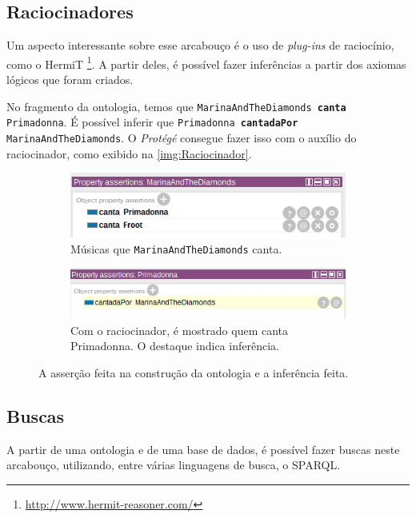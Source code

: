 \subsection{Raciocinadores}

Um aspecto interessante sobre esse arcabouço é o uso de \textit{plug-ins} de raciocínio, como o HermiT \footnote{\url{http://www.hermit-reasoner.com/}}. A partir deles, é possível fazer inferências a partir dos axiomas lógicos que foram criados.

No fragmento da ontologia, temos que \texttt{MarinaAndTheDiamonds \textbf{canta} Primadonna}. É possível inferir que \texttt{Primadonna \textbf{cantadaPor} MarinaAndTheDiamonds}. O \textit{Protégé} consegue fazer isso com o auxílio do raciocinador, como exibido na \autoref{img:Raciocinador}.

\begin{figure}[H]
	\centering
	\begin{subfigure}{.5\textwidth}
		\centering
		\includegraphics[width=0.9\linewidth]{Capitulos/Ferramentas/marinacanta}
		\caption{Músicas que \texttt{MarinaAndTheDiamonds} canta.}
	\end{subfigure}%
	\begin{subfigure}{.5\textwidth}
		\centering
		\includegraphics[width=0.95\linewidth]{Capitulos/Ferramentas/inferencia}
		\caption{Com o raciocinador, é mostrado quem canta Primadonna. O destaque indica inferência.}
	\end{subfigure}
	\caption{A asserção feita na construção da ontologia e a inferência feita.}
	\label{img:Raciocinador}
\end{figure}

\subsection{Buscas}

A partir de uma ontologia e de uma base de dados, é possível fazer buscas neste arcabouço, utilizando, entre várias linguagens de busca, o SPARQL.

